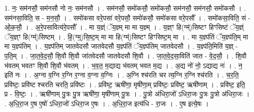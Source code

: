 \documentclass[17pt]{extarticle}
\begin{document}
1. नः॒ सम॑नसौ॒ सम॑नसौ नो नः॒ सम॑नसौ । . सम॑नसौ॒ समो॑कसौ॒ समो॑कसौ॒ सम॑नसौ॒ सम॑नसौ॒ समो॑कसौ । . सम॑नसा॒विति॒ स - म॒न॒सौ॒ । . समो॑कसा वरे॒पसा॑ वरे॒पसौ॒ समो॑कसौ॒ समो॑कसा वरे॒पसौ᳚ । . समो॑कसा॒विति॒ सं - ओ॒क॒सौ॒ । . अ॒रे॒पसावित्य॑रे॒पसौ᳚ । . मा य॒ज्ञ्ं ॅय॒ज्ञ्म् मा मा य॒ज्ञ्म् । . य॒ज्ञ्ꣳ हि(ग्म्॑)सिष्टꣳ हिꣳसिष्टं ॅय॒ज्ञ्ं ॅय॒ज्ञ्ꣳ हि(ग्म्॑)सिष्टम् । . हि॒(ग्म्॒)सि॒ष्ट॒म् मा मा हि(ग्म्॑)सिष्टꣳ हिꣳसिष्ट॒म् मा । . मा य॒ज्ञ्प॑तिं ॅय॒ज्ञ्प॑ति॒म् मा मा य॒ज्ञ्प॑तिम् । . य॒ज्ञ्प॑तिम् जातवेदसौ जातवेदसौ य॒ज्ञ्प॑तिं ॅय॒ज्ञ्प॑तिम् जातवेदसौ । . य॒ज्ञ्प॑ति॒मिति॑ य॒ज्ञ् - प॒ति॒म् । . जा॒त॒वे॒द॒सौ॒ शि॒वौ शि॒वौ जा॑तवेदसौ जातवेदसौ शि॒वौ । . जा॒त॒वे॒द॒सा॒विति॑ जात - वे॒द॒सौ॒ । . शि॒वौ भ॑वतम् भवतꣳ शि॒वौ शि॒वौ भ॑वतम् । . भ॒व॒त॒ म॒द्याद्य भ॑वतम् भवत म॒द्य । . अ॒द्य नो॑ नो॒ ऽद्याद्य नः॑ । . न॒ इति॑ नः । . अ॒ग्ना व॒ग्नि र॒ग्नि र॒ग्ना व॒ग्ना व॒ग्निः । . अ॒ग्नि श्च॑रति चर त्य॒ग्नि र॒ग्नि श्च॑रति । . च॒र॒ति॒ प्रवि॑ष्टः॒ प्रवि॑ष्ट श्चरति चरति॒ प्रवि॑ष्टः । . प्रवि॑ष्ट॒ ऋषी॑णा॒ मृषी॑णा॒म् प्रवि॑ष्टः॒ प्रवि॑ष्ट॒ ऋषी॑णाम् । . प्रवि॑ष्ट॒ इति॒ प्र - वि॒ष्टः॒ । . ऋषी॑णाम् पु॒त्रः पु॒त्र ऋषी॑णा॒ मृषी॑णाम् पु॒त्रः । . पु॒त्रो अ॑धिरा॒जो॑ ऽधिरा॒जः पु॒त्रः पु॒त्रो अ॑धिरा॒जः । . अ॒धि॒रा॒ज ए॒ष ए॒षो॑ ऽधिरा॒जो॑ ऽधिरा॒ज ए॒षः । . अ॒धि॒रा॒ज इत्य॑धि - रा॒जः । . ए॒ष इत्ये॒षः । \newline
\end{document}
